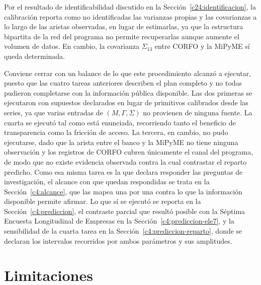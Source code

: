 Por el resultado de identificabilidad discutido en la
Sección~\ref{c24:identificacion}, la calibración reporta como no
identificadas las varianzas propias y las covarianzas a lo largo de las aristas
observadas, en lugar de estimarlas, ya que la estructura bipartita de la red del
programa no permite recuperarlas aunque aumente el volumen de datos. En cambio,
la covarianza $\Sigma_{13}$ entre CORFO y la MiPyME sí queda determinada.

Conviene cerrar con un balance de lo que este procedimiento alcanzó a ejecutar,
puesto que las cuatro tareas anteriores describen el plan completo y no todas
pudieron completarse con la información pública disponible. Las dos primeras se
ejecutaron con supuestos declarados en lugar de primitivos calibrados desde las
series, ya que varias entradas de $(M,\Gamma,\Sigma)$ no provienen de ninguna
fuente. La cuarta se ejecutó tal como está enunciada, recorriendo tanto el
beneficio de transparencia como la fricción de acceso. La tercera, en cambio, no
pudo ejecutarse, dado que la arista entre el banco y la MiPyME no tiene ninguna
observación y los registros de CORFO cubren únicamente el canal del programa, de
modo que no existe evidencia observada contra la cual contrastar el reparto
predicho. Como esa misma tarea es la que declara responder las preguntas de
investigación, el alcance con que quedan respondidas se trata en la
Sección~\ref{c4:alcance}, que las mapea una por una contra lo que la información
disponible permite afirmar. Lo que sí se ejecutó se reporta en la
Sección~\ref{c4:prediccion}, el contraste parcial que resultó posible con la
Séptima Encuesta Longitudinal de Empresas en la
Sección~\ref{c4:prediccion-ele7}, y la sensibilidad de la cuarta tarea en la
Sección~\ref{c4:prediccion-reparto}, donde se declaran los intervalos recorridos
por ambos parámetros y sus amplitudes.

\section{Limitaciones}
\label{c3:limitaciones}

